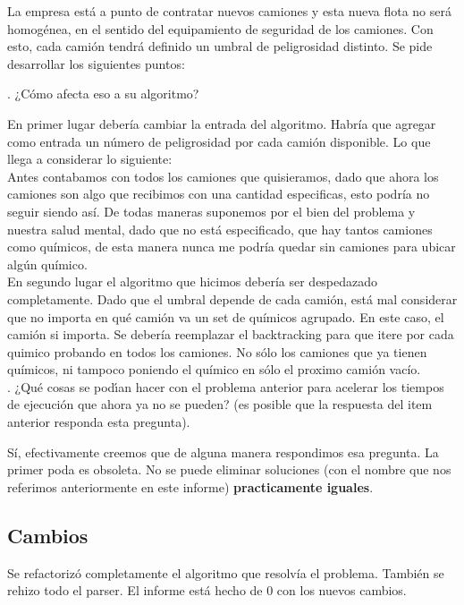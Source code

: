 \noindent 
La empresa est\'a a punto de contratar nuevos camiones y esta nueva flota no ser\'a homog\'enea, en el sentido del equipamiento de seguridad de los camiones. Con esto, cada cami\'on tendr\'a definido un umbral de peligrosidad distinto. Se pide desarrollar los siguientes puntos:

. ¿C\'omo afecta eso a su algoritmo?

\noindent 
En primer lugar deber\'ia cambiar la entrada del algoritmo. Habr\'ia que agregar como entrada un n\'umero de peligrosidad por cada cami\'on disponible. Lo que llega a considerar lo siguiente: \\
Antes contabamos con todos los camiones que quisieramos, dado que ahora los camiones son algo que recibimos con una cantidad especificas, esto podr\'ia no seguir siendo as\'i. De todas maneras suponemos por el bien del problema y nuestra salud mental, dado que no est\'a especificado, que hay tantos camiones como qu\'imicos, de esta manera nunca me podr\'ia quedar sin camiones para ubicar alg\'un qu\'imico. \\
En segundo lugar el algoritmo que hicimos deber\'ia ser despedazado completamente. Dado que el umbral depende de cada cami\'on, est\'a mal considerar que no importa en qu\'e cami\'on va un set de qu\'imicos agrupado. En este caso, el cami\'on si importa. Se deber\'ia reemplazar el backtracking para que itere por cada quimico probando en todos los camiones. No s\'olo los camiones que ya tienen qu\'imicos, ni tampoco poniendo el qu\'imico en s\'olo el proximo cami\'on vac\'io. \\

. ¿Qu\'e cosas se pod\'ıan hacer con el problema anterior para acelerar los tiempos de ejecuci\'on que ahora ya no se pueden? (es posible que la respuesta del item anterior responda esta pregunta).

\noindent 
S\'i, efectivamente creemos que de alguna manera respondimos esa pregunta. La primer poda es obsoleta. No se puede eliminar soluciones (con el nombre que nos referimos anteriormente en este informe) \textbf{practicamente iguales}. 

\subsection{Cambios}

Se refactorizó completamente el algoritmo que resolvía el problema. También se rehizo todo el parser. 
El informe está hecho de 0 con los nuevos cambios.


 


